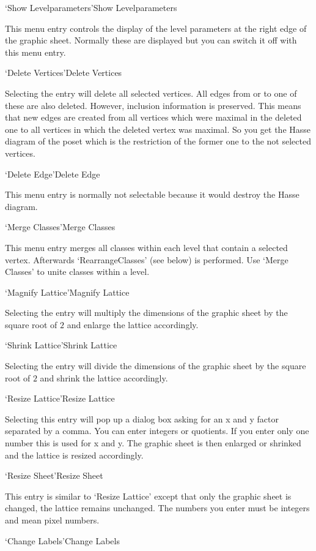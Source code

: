 \>`Show Levelparameters'{Show Levelparameters}

  This menu entry controls the display of the level parameters at the right 
  edge of the graphic sheet. Normally these are displayed but you can
  switch it off with this menu entry.

\>`Delete Vertices'{Delete Vertices}

  Selecting the entry will delete all selected vertices. All edges from or
  to one of these are also deleted. However, inclusion information is
  preserved. This means that new edges are created from all vertices which
  were maximal in the deleted one to all vertices in which the deleted
  vertex was maximal. So you get the Hasse diagram of the poset which is
  the restriction of the former one to the not selected vertices.

\>`Delete Edge'{Delete Edge}

  This menu entry is normally not selectable because it would destroy the
  Hasse diagram.
  
\>`Merge Classes'{Merge Classes}

  This menu entry merges all classes within each level that contain a
  selected vertex. Afterwards `RearrangeClasses' (see below) is performed.
  Use `Merge Classes' to unite classes within a level.

\>`Magnify Lattice'{Magnify Lattice}

  Selecting the entry will multiply the dimensions of the graphic sheet by
  the square root of $2$ and enlarge the lattice accordingly.

\>`Shrink Lattice'{Shrink Lattice}

  Selecting  the entry will divide the  dimensions  of the graphic sheet by 
  the square root of $2$ and shrink the lattice accordingly.

\>`Resize Lattice'{Resize Lattice}

Selecting this entry will pop up a dialog box asking for an x and y factor
separated by a comma.  You can enter integers or quotients. If you enter
only one number this is used for x and y.  The graphic sheet is then
enlarged or shrinked and the lattice is resized accordingly.

\>`Resize Sheet'{Resize Sheet}

This  entry is similar to `Resize  Lattice' except that  only the graphic
sheet is changed, the lattice remains unchanged. The numbers you enter must 
be integers and mean pixel numbers.

\>`Change Labels'{Change Labels}

